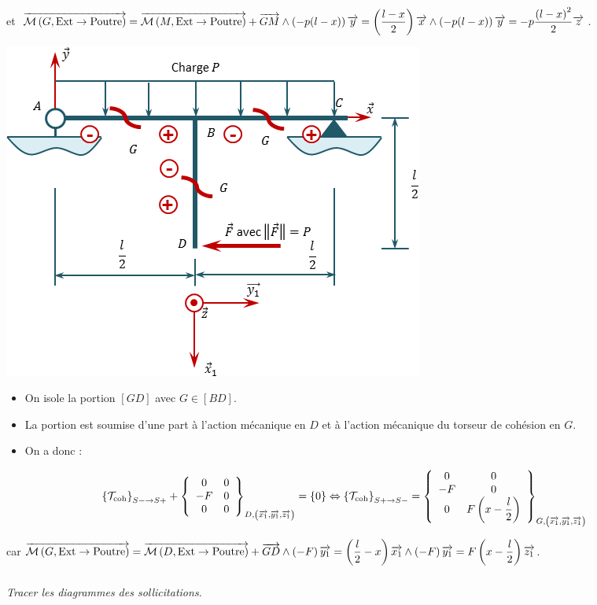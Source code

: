\documentclass[10pt,fleqn]{article} %
\begin{document}
\begin{multicols}{2}
\begin{corrige}
et 
$\vectm{G}{\text{Ext}}{\text{Poutre}}
=  \vectm{M}{\text{Ext}}{\text{Poutre}} + \vect{GM}\wedge \left( -p(l-x) \right) \vect{y}  
= \left(\dfrac{l-x}{2}\right)\vect{x}\wedge \left(-p(l-x)\right) \vect{y}  
=  -p\dfrac{\left(l-x\right)^2}{2}\vect{z}  
$.

\begin{center}
\includegraphics[width=.45\linewidth]{images/exo_03_corr_02}
\end{center}

\begin{itemize}[label=,font=\color{ocre}] 
\item On isole la portion $[GD]$ avec $G\in [BD]$.
\item La portion est soumise d'une part à l'action mécanique en $D$ et à l'action mécanique du torseur de cohésion en $G$.
\item On a donc : 
\end{itemize}
$$
\torseurscoh_{S-\rightarrow S+} +
 \torseurcol{0}{-F}{0}{0}{0}{0}{D,\left( \vect{x_1},\vect{y_1},\vect{z_1} \right)} 
 = \{0\}
 \Leftrightarrow
\torseurscoh_{S+\rightarrow S-} =
 \torseurcol{0}{-F}{0}{0}{0}{F \left(x-\dfrac{l}{2}\right) }{G,\left( \vect{x_1},\vect{y_1},\vect{z_1} \right)}  
$$

car
$\vectm{G}{\text{Ext}}{\text{Poutre}}
=  \vectm{D}{\text{Ext}}{\text{Poutre}} + \vect{GD}\wedge \left(-F \right) \vect{y_1}  
= \left(\dfrac{l}{2}-x\right)\vect{x_1}\wedge \left(-F\right) \vect{y_1}  
=F \left(x-\dfrac{l}{2}\right)  \vect{z_1}  
$.


\end{corrige}
\else 
\fi

\subparagraph{}
\textit{Tracer les diagrammes des sollicitations.}
\ifprof
\begin{corrige}~\\


\end{corrige}
\end{multicols}
\end{document}
